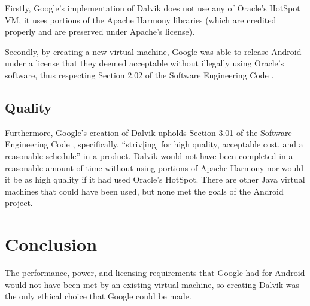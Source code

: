\documentclass[11pt]{article}
\begin{document}
\begin{multicols}{2}
Firstly, Google's implementation of Dalvik does not use any of Oracle's HotSpot
VM, it uses portions of the Apache Harmony libraries (which are credited
properly \cite{dalvik-readme} and are preserved under Apache's license).  

Secondly, by creating a new virtual machine, Google was able to release Android
under a license that they deemed acceptable without illegally using Oracle's
software, thus respecting Section 2.02 of the Software Engineering Code
\cite{secode}.


\subsection{Quality} %
\label{sub:analysis_quality}

Furthermore, Google's creation of Dalvik upholds Section 3.01 of the Software
Engineering Code \cite{secode}, specifically, ``striv[ing] for high quality,
acceptable cost, and a reasonable schedule'' in a product.  Dalvik would not
have been completed in a reasonable amount of time without using portions of
Apache Harmony nor would it be as high quality if it had used Oracle's HotSpot.
There are other Java virtual machines that could have been used, but none met
the goals of the Android project.



\section{Conclusion} %

The performance, power, and licensing requirements that Google had for Android
would not have been met by an existing virtual machine, so creating Dalvik was
the only ethical choice that Google could be made. 

\end{multicols}
\newpage




\end{document}
